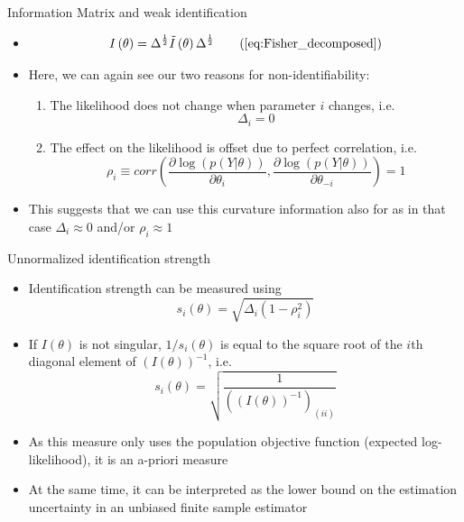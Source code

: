 \documentclass[handout,usepdftitle=false,xcolor=dvipsnames,aspectratio=169]{beamer}
\begin{document}
\begin{frame}{Information Matrix and weak identification}
  \begin{itemize}
    \item[]
          \begin{equation}
            I\left( \theta  \right) = {\Delta ^{\frac{1}{2}}}\tilde I\left( \theta  \right){\Delta ^{\frac{1}{2}}} \tag{\ref{eq:Fisher_decomposed}}
          \end{equation}
    \item Here, we can again see our two reasons for non-identifiability:
          \begin{enumerate}
            \item The likelihood does not change when parameter $i$ changes, i.e.\
                  \begin{equation}
                    \Delta_i=0
                  \end{equation}

            \item The effect on the likelihood is offset due to perfect correlation, i.e.\
                  \begin{equation}
                    {\rho _i} \equiv corr\left( {\frac{{\partial \log \left( {p\left( {Y|\theta } \right)} \right)}}{{\partial {\theta _i}}},\frac{{\partial \log \left( {p\left( {Y|\theta } \right)} \right)}}{{\partial {\theta _{ - i}}}}} \right) = 1
                  \end{equation}
          \end{enumerate}
    \item This suggests that we can use this curvature information also for  as in that case $\Delta_i\approx 0$ and/or $\rho_i\approx1$
  \end{itemize}
\end{frame}

\begin{frame}{Unnormalized identification strength}
  \begin{itemize}
    \item Identification strength can be measured using
          \begin{equation}
            {s_i}\left( \theta  \right) = \sqrt {{\Delta _i}\left( {1 - \rho _i^2} \right)}
          \end{equation}
    \item If $I(\theta)$ is not singular, $1/{s_i}\left( \theta  \right)$ is equal to the square root of the $i$th diagonal element of $(I(\theta))^{-1}$, i.e.
          \begin{equation}
            {s_i}\left( \theta  \right)=\sqrt{\frac{1}{\left(\left(I(\theta)\right)^{-1}\right)_{(ii)}}} \label{eq:sensitivity}
          \end{equation}
    \item As this measure only uses the population objective function (expected log-likelihood), it is an a-priori measure
    \item At the same time, it can be interpreted as the lower bound on the estimation uncertainty in an unbiased finite sample estimator
  \end{itemize}
\end{frame}
\end{document}
